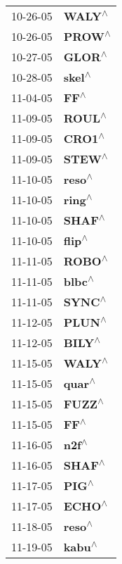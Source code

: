 \begin{supertabular}{p{0.08\textwidth}p{0.2\textwidth}}
 10-26-05 &    \textbf{WALY\textsuperscript{$\wedge$}} \\
 10-26-05 &    \textbf{PROW\textsuperscript{$\wedge$}} \\
 10-27-05 &    \textbf{GLOR\textsuperscript{$\wedge$}} \\
 10-28-05 &    \textbf{skel\textsuperscript{$\wedge$}} \\
 11-04-05 &      \textbf{FF\textsuperscript{$\wedge$}} \\
 11-09-05 &    \textbf{ROUL\textsuperscript{$\wedge$}} \\
 11-09-05 &    \textbf{CRO1\textsuperscript{$\wedge$}} \\
 11-09-05 &    \textbf{STEW\textsuperscript{$\wedge$}} \\
 11-10-05 &    \textbf{reso\textsuperscript{$\wedge$}} \\
 11-10-05 &    \textbf{ring\textsuperscript{$\wedge$}} \\
 11-10-05 &    \textbf{SHAF\textsuperscript{$\wedge$}} \\
 11-10-05 &    \textbf{flip\textsuperscript{$\wedge$}} \\
 11-11-05 &    \textbf{ROBO\textsuperscript{$\wedge$}} \\
 11-11-05 &    \textbf{blbc\textsuperscript{$\wedge$}} \\
 11-11-05 &    \textbf{SYNC\textsuperscript{$\wedge$}} \\
 11-12-05 &    \textbf{PLUN\textsuperscript{$\wedge$}} \\
 11-12-05 &    \textbf{BILY\textsuperscript{$\wedge$}} \\
 11-15-05 &    \textbf{WALY\textsuperscript{$\wedge$}} \\
 11-15-05 &    \textbf{quar\textsuperscript{$\wedge$}} \\
 11-15-05 &    \textbf{FUZZ\textsuperscript{$\wedge$}} \\
 11-15-05 &      \textbf{FF\textsuperscript{$\wedge$}} \\
 11-16-05 &     \textbf{n2f\textsuperscript{$\wedge$}} \\
 11-16-05 &    \textbf{SHAF\textsuperscript{$\wedge$}} \\
 11-17-05 &     \textbf{PIG\textsuperscript{$\wedge$}} \\
 11-17-05 &    \textbf{ECHO\textsuperscript{$\wedge$}} \\
 11-18-05 &    \textbf{reso\textsuperscript{$\wedge$}} \\
 11-19-05 &    \textbf{kabu\textsuperscript{$\wedge$}} \\

\end{supertabular}

